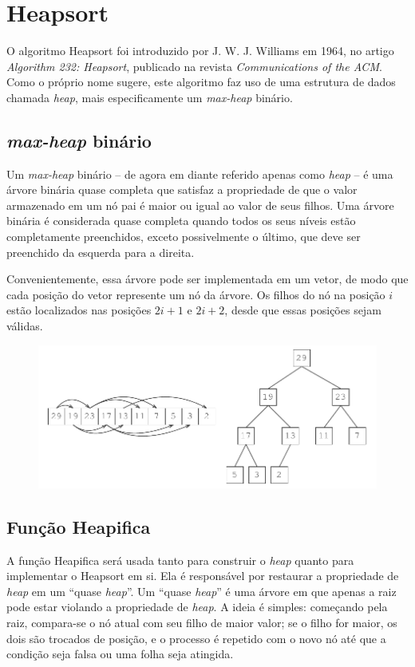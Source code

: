 \section{Heapsort}
O algoritmo Heapsort foi introduzido por J. W. J. Williams em 1964, no artigo \textit{Algorithm 232: Heapsort}, publicado na revista \textit{Communications of the ACM}. Como o próprio nome sugere, este algoritmo faz uso de uma estrutura de dados chamada \textit{heap}, mais especificamente um \textit{max-heap} binário.

\subsection*{\textit{max-heap} binário}
Um \textit{max-heap} binário -- de agora em diante referido apenas como \textit{heap} -- é uma árvore binária quase completa que satisfaz a propriedade de que o valor armazenado em um nó pai é maior ou igual ao valor de seus filhos. Uma árvore binária é considerada quase completa quando todos os seus níveis estão completamente preenchidos, exceto possivelmente o último, que deve ser preenchido da esquerda para a direita.

Convenientemente, essa árvore pode ser implementada em um vetor, de modo que cada posição do vetor represente um nó da árvore. Os filhos do nó na posição $i$ estão localizados nas posições $2i + 1$ e $2i + 2$, desde que essas posições sejam válidas.

\begin{figure}[H]
\centering
\includegraphics[scale=1.0]{figuras/pdf/max-heap.pdf}
\end{figure}

\subsection*{Função Heapifica}
A função Heapifica será usada tanto para construir o \textit{heap} quanto para implementar o Heapsort em si. Ela é responsável por restaurar a propriedade de \textit{heap} em um ``quase \textit{heap}''. Um ``quase \textit{heap}'' é uma árvore em que apenas a raiz pode estar violando a propriedade de \textit{heap}. A ideia é simples: começando pela raiz, compara-se o nó atual com seu filho de maior valor; se o filho for maior, os dois são trocados de posição, e o processo é repetido com o novo nó até que a condição seja falsa ou uma folha seja atingida.


